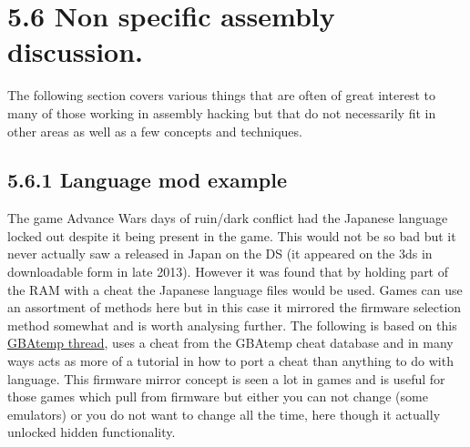 \documentclass[
]{book}
\begin{document}
\hypertarget{non-specific-assembly-discussion.}{%
\section{5.6 Non specific assembly discussion.}\label{non-specific-assembly-discussion.}}

The following section covers various things that are often of great interest to many of those working in assembly hacking but that do not necessarily fit in other areas as well as a few concepts and techniques.

\hypertarget{language-mod-example}{%
\subsection{5.6.1 Language mod example}\label{language-mod-example}}

The game Advance Wars days of ruin/dark conflict had the Japanese language locked out despite it being present in the game. This would not be so bad but it never actually saw a released in Japan on the DS (it appeared on the 3ds in downloadable form in late 2013). However it was found that by holding part of the RAM with a cheat the Japanese language files would be used. Games can use an assortment of methods here but in this case it mirrored the firmware selection method somewhat and is worth analysing further. The following is based on this \href{http://gbatemp.net/topic/254868-advance-wars-days-of-ruindark-conflict-language-mod/}{GBAtemp thread}, uses a cheat from the GBAtemp cheat database and in many ways acts as more of a tutorial in how to port a cheat than anything to do with language. This firmware mirror concept is seen a lot in games and is useful for those games which pull from firmware but either you can not change (some emulators) or you do not want to change all the time, here though it actually unlocked hidden functionality.
\end{document}
